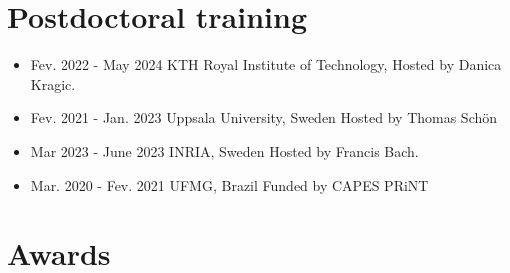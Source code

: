 \documentclass[10pt,A4]{article} %
\begin{document}
\section{Postdoctoral training} %

\begin{itemize}

    \item {}
    { Fev. 2022 -   May 2024  }
    { KTH Royal Institute of Technology,   }{}{} Hosted by Danica Kragic.

    \item {}
    { Fev. 2021 -   Jan. 2023  }
    { Uppsala University, Sweden  }{}{} Hosted by Thomas Schön

    \item {}
    { Mar 2023 -   June 2023  }
    { INRIA, Sweden  }{}{} Hosted by Francis Bach.

    \item {}
    { Mar. 2020 -   Fev. 2021  }
    { UFMG, Brazil  }{}{} Funded by CAPES PRiNT

\end{itemize}
  

\section{Awards}
\end{document}
